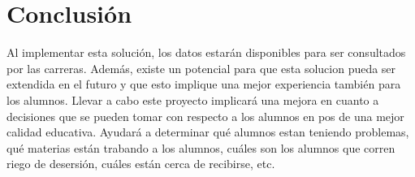 \section[Conclusión]{Conclusión}

Al implementar esta solución, los datos estarán disponibles para ser consultados por las carreras. Además, existe un potencial para que esta solucion pueda ser extendida en el futuro y que esto implique una mejor experiencia también para los alumnos.
Llevar a cabo este proyecto implicará una mejora en cuanto a decisiones que se pueden tomar con respecto a los alumnos en pos de una mejor calidad educativa. Ayudará a determinar qué alumnos estan teniendo problemas, qué materias están trabando a los alumnos, cuáles son los alumnos que corren riego de desersión, cuáles están cerca de recibirse, etc.



